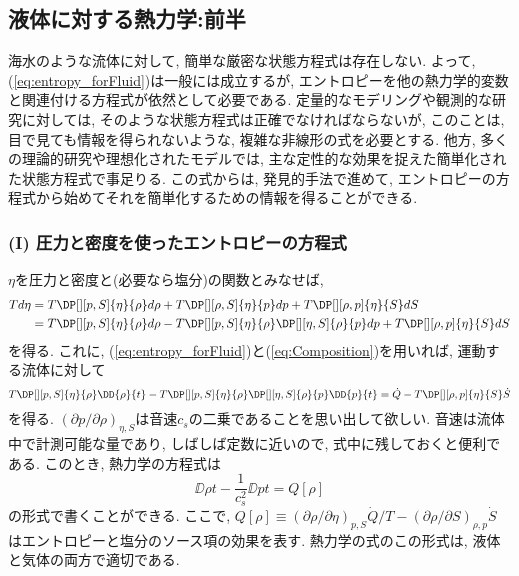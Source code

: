 \subsection{液体に対する熱力学:前半}
海水のような流体に対して, 簡単な厳密な状態方程式は存在しない. 
よって, (\ref{eq:entropy_forFluid})は一般には成立するが, 
エントロピーを他の熱力学的変数と関連付ける方程式が依然として必要である. 
定量的なモデリングや観測的な研究に対しては, そのような状態方程式は正確でなければならないが, 
このことは, 目で見ても情報を得られないような, 複雑な非線形の式を必要とする. 
他方, 多くの理論的研究や理想化されたモデルでは, 主な定性的な効果を捉えた簡単化された状態方程式で事足りる. 
この式からは, 発見的手法で進めて, エントロピーの方程式から始めてそれを簡単化するための情報を得ることができる. 

\subsubsection*{(I) 圧力と密度を使ったエントロピーの方程式}
$\eta$を圧力と密度と(必要なら塩分)の関数とみなせば, 
\begin{equation}
\begin{split}
 Td\eta 
 &= T \DP[][p,S]{\eta}{\rho} d\rho + T \DP[][\rho,S]{\eta}{p} dp + T \DP[][\rho,p]{\eta}{S} dS \\
 &= T \DP[][p,S]{\eta}{\rho} d\rho - T \DP[][p,S]{\eta}{\rho} \DP[][\eta,S]{\rho}{p} dp + T \DP[][\rho,p]{\eta}{S} dS 
\end{split}
\end{equation}
を得る. 
これに, (\ref{eq:entropy_forFluid})と(\ref{eq:Composition})を用いれば, 
運動する流体に対して
\begin{equation}
   T \DP[][p,S]{\eta}{\rho} \DD{\rho}{t} - T \DP[][p,S]{\eta}{\rho} \DP[][\eta,S]{\rho}{p} \DD{p}{t} 
 = \dot{Q} - T \DP[][\rho,p]{\eta}{S} \dot{S}
\end{equation}
を得る. 
$(\partial p/\partial \rho)_{\eta,S}$は音速$c_s$の二乗であることを思い出して欲しい. 
音速は流体中で計測可能な量であり, しばしば定数に近いので, 式中に残しておくと便利である. 
このとき, 熱力学の方程式は
\begin{equation}
 \boxed{
 \DD{\rho}{t} - \dfrac{1}{c_s^2} \DD{p}{t} = Q[\rho]
\label{eq:entropyEq_withDens,P}
 }
\end{equation}
の形式で書くことができる. 
ここで, 
$Q[\rho] \equiv (\partial \rho/\partial \eta)_{p,S} \dot{Q}/T - (\partial \rho/\partial S)_{\rho,p} \dot{S}$
はエントロピーと塩分のソース項の効果を表す. 
熱力学の式のこの形式は, 液体と気体の両方で適切である. 

